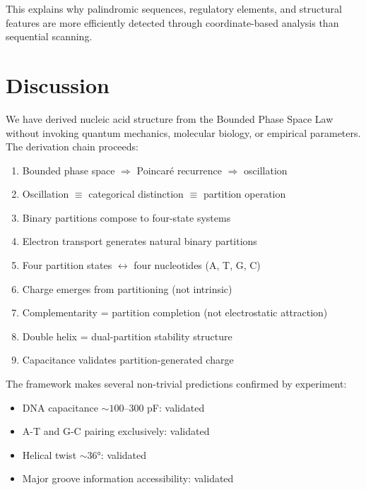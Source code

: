 \documentclass[twocolumn,10pt,a4paper]{article}
\theoremstyle{definition}
\theoremstyle{remark}
\begin{document}
This explains why palindromic sequences, regulatory elements, and structural features are more efficiently detected through coordinate-based analysis than sequential scanning.

\section{Discussion}
\label{sec:discussion}

We have derived nucleic acid structure from the Bounded Phase Space Law without invoking quantum mechanics, molecular biology, or empirical parameters. The derivation chain proceeds:

\begin{enumerate}
    \item Bounded phase space $\Rightarrow$ Poincar\'{e} recurrence $\Rightarrow$ oscillation
    \item Oscillation $\equiv$ categorical distinction $\equiv$ partition operation
    \item Binary partitions compose to four-state systems
    \item Electron transport generates natural binary partitions
    \item Four partition states $\leftrightarrow$ four nucleotides (A, T, G, C)
    \item Charge emerges from partitioning (not intrinsic)
    \item Complementarity = partition completion (not electrostatic attraction)
    \item Double helix = dual-partition stability structure
    \item Capacitance validates partition-generated charge
\end{enumerate}

The framework makes several non-trivial predictions confirmed by experiment:
\begin{itemize}
    \item DNA capacitance $\sim 100$--$300$ pF: validated \cite{kornyshev2007}
    \item A-T and G-C pairing exclusively: validated \cite{watson1953}
    \item Helical twist $\sim 36°$: validated \cite{franklin1953}
    \item Major groove information accessibility: validated \cite{seeman1976}
\end{itemize}
\end{document}
